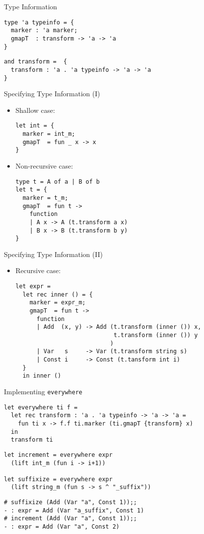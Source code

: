 \begin{frame}[fragile]{Type Information}
\begin{lstlisting}
type 'a typeinfo = {
  marker : 'a marker;
  gmapT  : transform -> 'a -> 'a
}
\end{lstlisting}
\pause
\begin{lstlisting}
and transform =  {
  transform : 'a . 'a typeinfo -> 'a -> 'a
}
\end{lstlisting}
\end{frame}

\begin{frame}[fragile]{Specifying Type Information (I)}
\begin{itemize}
\item Shallow case:
\begin{lstlisting}
let int = {
  marker = int_m; 
  gmapT  = fun _ x -> x
}
\end{lstlisting}
\pause
\item Non-recursive case:
\begin{lstlisting}
type t = A of a | B of b
let t = {
  marker = t_m; 
  gmapT  = fun t -> 
    function 
    | A x -> A (t.transform a x)
    | B x -> B (t.transform b y)
}
\end{lstlisting}

\end{itemize}
\end{frame}

\begin{frame}[fragile]{Specifying Type Information (II)}
\begin{itemize}
\item Recursive case:
\begin{lstlisting}
let expr = 
  let rec inner () = {
    marker = expr_m; 
    gmapT  = fun t -> 
      function 
      | Add  (x, y) -> Add (t.transform (inner ()) x, 
                            t.transform (inner ()) y
                           )
      | Var   s     -> Var (t.transform string s)
      | Const i     -> Const (t.tansform int i)
  }
  in inner ()
\end{lstlisting}
\end{itemize}
\end{frame}

\begin{frame}[fragile]{Implementing \texttt{everywhere}}

\begin{lstlisting}
let everywhere ti f =
  let rec transform : 'a . 'a typeinfo -> 'a -> 'a = 
    fun ti x -> f.f ti.marker (ti.gmapT {transform} x)
  in
  transform ti
\end{lstlisting}
\pause
\begin{lstlisting}
let increment = everywhere expr 
  (lift int_m (fun i -> i+1))

let suffixize = everywhere expr 
  (lift string_m (fun s -> s ^ "_suffix"))
\end{lstlisting}
\pause
\begin{verbatim}
# suffixize (Add (Var "a", Const 1));;
- : expr = Add (Var "a_suffix", Const 1)
# increment (Add (Var "a", Const 1));;
- : expr = Add (Var "a", Const 2)
\end{verbatim}
\end{frame}

